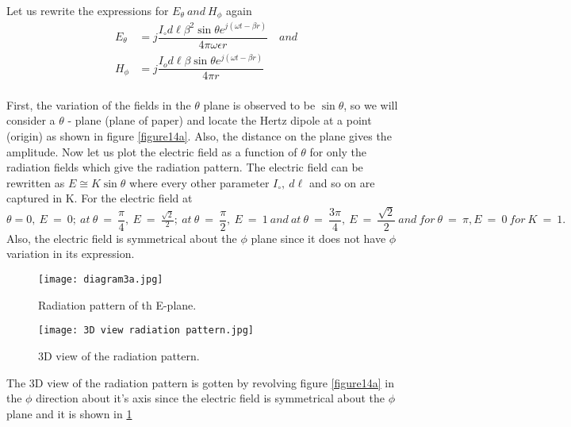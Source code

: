 \paragraph{}
Let us rewrite the expressions for $E_\theta \ and \ H_\phi$ again
\begin{align*}
E_\theta &= j\dfrac{I_\circ d\ell\beta^2\sin\theta e^{j(\omega t - \beta r)}}{4\pi\omega\epsilon r} \quad and 
\\
H_\phi &= j\dfrac{I_od\ell\beta\sin\theta e^{j(\omega t - \beta r)}}{4\pi r}
\end{align*}
\paragraph{}
First, the variation of the fields in the $\theta$ plane is observed to be $\sin\theta$, so we will consider a $\theta$ - plane (plane of paper) and locate the Hertz dipole at a point (origin) as shown in figure \ref{figure14a}. Also, the distance on the plane gives the amplitude. Now let us plot the electric field as a function of $\theta$ for only the radiation fields which give the radiation pattern. The electric field can be rewritten as $E \cong K\sin\theta$ where every other parameter $I_\circ, \ d\ell$ and so on are captured in K. For the electric field at $\theta = 0,\ E\ =\ 0;\ at\ \theta\ =\ \dfrac{\pi}{4},\ E\ =\ \frac{\sqrt{2}}{2};\ at\ \theta\ =\ \dfrac{\pi}{2},\ E\ =\ 1\ and\ at\ \theta\ =\ \dfrac{3\pi}{4},\ E\ =\ \dfrac{\sqrt{2}}{2}\ and\ for\ \theta\ =\ \pi, E\ =\ 0\ for\ K\ =\ 1. $
Also, the electric field is symmetrical about the $\phi$ plane since it does not have $\phi$ variation in its expression. 
\begin{figure}[!tbp]
	\centering
	\begin{minipage}[b]{0.4\textwidth}
		\texttt{[image: diagram3a.jpg]}
		\caption{Radiation pattern of th E-plane.}
		\label{figure14a}
	\end{minipage}
	\hfill
	\begin{minipage}[b]{0.4\textwidth}
		\texttt{[image: 3D view radiation pattern.jpg]}
		\caption{3D view of the radiation pattern.}
		\label{figure14b}
	\end{minipage}
\end{figure}

The 3D view of the radiation pattern is gotten by revolving figure \ref{figure14a} in the $\phi$ direction about it's axis since the electric field is symmetrical about the $\phi$ plane and it is shown in \ref{figure14b}

